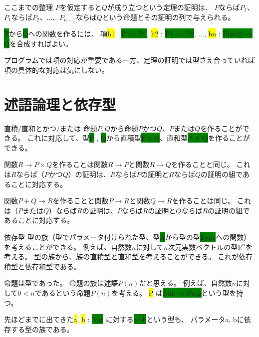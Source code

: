 \documentclass[unicode,12pt]{beamer}%
\newcommand{\type}[1]{\colorbox{green}{#1}}
\newcommand{\term}[1]{\colorbox{yellow}{#1}}
\begin{document}
\begin{frame}{ここまでの整理}
  $P$を仮定すると$Q$が成り立つという定理の証明は、
  $P$ならば$P_1$、$P_1$ならば$P_2$、$\ldots$、$P_{n-1}$ならば$Q$という命題とその証明の列で与えられる。

  \type{P}から\type{Q}への関数を作るには、
  項\term{h1} : \type{P -> P1}, \term{h2} : \type{P1 -> P2}, $\ldots$, \term{hn} : \type{P(n-1) -> Q}を合成すればよい。

  プログラムでは項の対応が重要である一方、定理の証明では型さえ合っていれば項の具体的な対応は気にしない。
\end{frame}

\section{述語論理と依存型}

\begin{frame}{直積/直和とかつ/または}
  命題$P, Q$から命題$P$かつ$Q$、$P$または$Q$を作ることができる。
  これに対応して、型\type{P} , \type{Q}から直積型\type{P x Q}、直和型\type{P + Q}を作ることができる。

  \pause

  関数$R\to P\times Q$を作ることは関数$R\to P$と関数$R\to Q$を作ることと同じ。
  これは$R$ならば（$P$かつ$Q$）の証明は、$R$ならば$P$の証明と$R$ならば$Q$の証明の組であることに対応する。

  \pause

  関数$P+Q\to R$を作ることと関数$P\to R$と関数$Q\to R$を作ることは同じ。
  これは（$P$または$Q$）ならば$R$の証明は、$P$ならば$R$の証明と$Q$ならば$R$の証明の組であることに対応する。
\end{frame}

\begin{frame}{依存型}
  型の族（型でパラメータ付けられた型、型\type{A}から型の型\type{Type}への関数）を考えることができる。
  例えば、自然数$n$に対して$n$次元実数ベクトルの型$\mathbb{R}^n$を考える。
  型の族から、族の直積型と直和型を考えることができる。
  これが依存積型と依存和型である。

  \pause

  命題は型であった。
  命題の族は述語$P(n)$だと思える。
  例えば、自然数$n$に対して$0<n$であるという命題$P(n)$を考える。
  \term{P} は\type{Nat -> Prop}という型を持つ。

  \pause

  先ほどまでに出てきた\term{a}, \term{b} : \type{Nat} に対する\type{a=b}という型も、
  パラメータa, bに依存する型の族である。
\end{frame}
\end{document}
